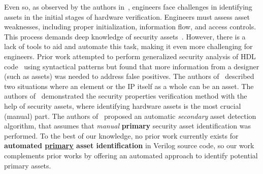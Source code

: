 Even so, as observed by the authors in~\cite{10140100}, engineers face challenges in identifying assets in the initial stages of hardware verification. 
Engineers must assess asset weaknesses, including proper initialization, information flow, and access controls. This process demands deep knowledge of security assets~\cite{ray_system--chip_2018}. However, there is a lack of tools to aid and automate this task, making it even more challenging for engineers.
Prior work attempted to perform generalized security analysis of \ac{HDL} code~\cite{Ahmad_2022} using syntactical patterns but found that more information from a designer (such as assets) was needed to address false positives. 
The authors of~\cite{polian_introduction_2017} described two situations where an element or the \ac{IP} itself as a whole can be an asset.
The authors of~\cite{meza_security_2023} demonstrated the security properties verification method with the help of security assets, where identifying hardware assets is the most crucial (manual) part. 
The authors of~\cite{farzana_saif_2021, Ayalasomayajula_Automatic_2024} proposed an automatic \textit{secondary} asset detection algorithm, that assumes that \textit{manual} \textbf{primary} security asset identification was performed. 
To the best of our knowledge, no prior work currently exists for \textbf{automated \underline{primary} asset identification} in Verilog source code, so our work complements prior works by offering an automated approach to identify potential primary assets. 
